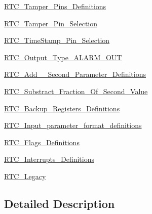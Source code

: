\begin{DoxyCompactItemize}
\hyperlink{group___r_t_c___tamper___pins___definitions}{R\-T\-C\-\_\-\-Tamper\-\_\-\-Pins\-\_\-\-Definitions}
\item 
\hyperlink{group___r_t_c___tamper___pin___selection}{R\-T\-C\-\_\-\-Tamper\-\_\-\-Pin\-\_\-\-Selection}
\item 
\hyperlink{group___r_t_c___time_stamp___pin___selection}{R\-T\-C\-\_\-\-Time\-Stamp\-\_\-\-Pin\-\_\-\-Selection}
\item 
\hyperlink{group___r_t_c___output___type___a_l_a_r_m___o_u_t}{R\-T\-C\-\_\-\-Output\-\_\-\-Type\-\_\-\-A\-L\-A\-R\-M\-\_\-\-O\-U\-T}
\item 
\hyperlink{group___r_t_c___add__1___second___parameter___definitions}{R\-T\-C\-\_\-\-Add\-\_\-\_\-\-Second\-\_\-\-Parameter\-\_\-\-Definitions}
\item 
\hyperlink{group___r_t_c___substract___fraction___of___second___value}{R\-T\-C\-\_\-\-Substract\-\_\-\-Fraction\-\_\-\-Of\-\_\-\-Second\-\_\-\-Value}
\item 
\hyperlink{group___r_t_c___backup___registers___definitions}{R\-T\-C\-\_\-\-Backup\-\_\-\-Registers\-\_\-\-Definitions}
\item 
\hyperlink{group___r_t_c___input__parameter__format__definitions}{R\-T\-C\-\_\-\-Input\-\_\-parameter\-\_\-format\-\_\-definitions}
\item 
\hyperlink{group___r_t_c___flags___definitions}{R\-T\-C\-\_\-\-Flags\-\_\-\-Definitions}
\item 
\hyperlink{group___r_t_c___interrupts___definitions}{R\-T\-C\-\_\-\-Interrupts\-\_\-\-Definitions}
\item 
\hyperlink{group___r_t_c___legacy}{R\-T\-C\-\_\-\-Legacy}
\end{DoxyCompactItemize}


\subsection{Detailed Description}
